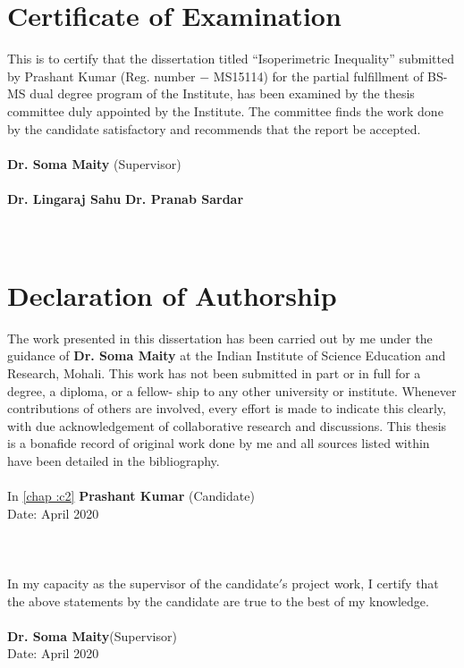 \documentclass[oneside]{book}
\begin{document}
 \chapter*{Certificate of Examination} 
This is to certify that the dissertation titled \enquote{Isoperimetric Inequality} submitted by Prashant Kumar (Reg. number $-$ MS15114) for the partial fulfillment of BS-MS dual degree program of the Institute, has been examined by the thesis committee duly appointed by the Institute. The committee finds the work done by the candidate satisfactory and recommends that the report be accepted.\\\\
\textbf{Dr. Soma Maity} (Supervisor)\\
\\
 \textbf{Dr. Lingaraj Sahu}  \hfill           \textbf{ Dr. Pranab Sardar}\\
\\
\\
\thispagestyle{empty}
\chapter*{Declaration of Authorship}
The work presented in this dissertation has been carried out by me under the guidance of \textbf{Dr. Soma Maity} at the Indian Institute of Science Education and Research, Mohali.
This work has not been submitted in part or in full for a degree, a diploma, or a fellow- ship to any other university or institute. Whenever contributions of others are involved, every effort is made to indicate this clearly, with due acknowledgement of collaborative research and discussions. This thesis is a bonafide record of original work done by me and all sources listed within have been detailed in the bibliography.\\
\\  In \ref{chap :c2}
\textbf{Prashant Kumar} (Candidate)\\
Date: April 2020\\
\\
\\
\\
In my capacity as the supervisor of the candidate$'$s project work, I certify that the above statements by the candidate are true to the best of my knowledge.\\
\\
\textbf{Dr. Soma Maity}(Supervisor)\\
Date: April 2020
\thispagestyle{empty}
\end{document}
